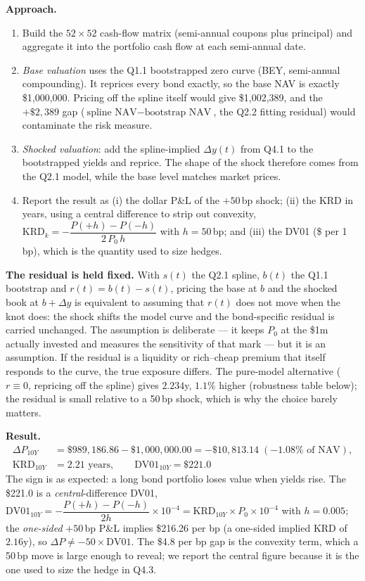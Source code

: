 \documentclass[11pt]{article}
\begin{document}
\textbf{Approach.}
\begin{enumerate}[nosep]
\item Build the $52\times52$ cash-flow matrix (semi-annual coupons plus
principal) and aggregate it into the portfolio cash flow at each semi-annual
date.
\item \emph{Base valuation} uses the Q1.1 bootstrapped zero curve (BEY,
semi-annual compounding). It reprices every bond exactly, so the base NAV is
exactly \$1,000,000. Pricing off the spline itself would give
\$1{,}002{,}389, and the $+\$2{,}389$ gap ($\text{spline NAV}-\text{bootstrap NAV}$,
the Q2.2 fitting residual) would contaminate the risk measure.
\item \emph{Shocked valuation}: add the spline-implied $\Delta y(t)$ from Q4.1
to the bootstrapped yields and reprice. The shape of the shock therefore
comes from the Q2.1 model, while the base level matches market prices.
\item Report the result as (i) the dollar P\&L of the $+50$\,bp shock;
(ii) the KRD in years, using a central difference to strip out convexity,
$\text{KRD}_k = -\dfrac{P(+h)-P(-h)}{2\,P_0\,h}$ with $h=50$\,bp; and
(iii) the DV01 (\$ per 1\,bp), which is the quantity used to size hedges.
\end{enumerate}

\textbf{The residual is held fixed.} With $s(t)$ the Q2.1 spline, $b(t)$ the
Q1.1 bootstrap and $r(t)=b(t)-s(t)$, pricing the base at $b$ and the shocked
book at $b+\Delta y$ is equivalent to assuming that $r(t)$ does not move when
the knot does: the shock shifts the model curve and the bond-specific residual
is carried unchanged. The assumption is deliberate --- it keeps $P_0$ at the
\$1m actually invested and measures the sensitivity of that mark --- but it is
an assumption. If the residual is a liquidity or rich--cheap premium that
itself responds to the curve, the true exposure differs. The pure-model
alternative ($r\equiv 0$, repricing off the spline) gives $2.234$y, $1.1\%$
higher (robustness table below); the residual is small relative to a 50\,bp
shock, which is why the choice barely matters.

\textbf{Result.}
\[\boxed{\begin{aligned}
\Delta P_{10Y} &= \$989{,}186.86 - \$1{,}000{,}000.00 = -\$10{,}813.14
\;(-1.08\%\text{ of NAV}), \\
\text{KRD}_{10Y} &= 2.21\text{ years}, \qquad \text{DV01}_{10Y} = \$221.0
\end{aligned}}\]
The sign is as expected: a long bond portfolio loses value when yields rise.
The \$221.0 is a \emph{central}-difference DV01,
$\text{DV01}_{10Y}=-\dfrac{P(+h)-P(-h)}{2h}\times10^{-4}=\text{KRD}_{10Y}\times P_0\times10^{-4}$
with $h=0.005$; the \emph{one-sided} $+50$\,bp
P\&L implies \$216.26 per bp (a one-sided implied KRD of $2.16$y), so
$\Delta P\neq-50\times\text{DV01}$. The
\$4.8 per bp gap is the convexity term, which a 50\,bp move is large enough to
reveal; we report the central figure because it is the one used to size the
hedge in Q4.3.
\end{document}
